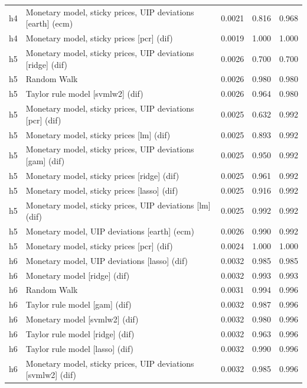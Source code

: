 \begin{ThreePartTable}
\begin{longtable}[t]{cp{5.5cm}ccc}
h4 & \raggedright Monetary model, sticky prices, UIP deviations [earth] (ecm) & 0.0021 & 0.816 & 0.968\\
h4 & \raggedright Monetary model, sticky prices [pcr] (dif) & 0.0019 & 1.000 & 1.000\\
\addlinespace
h5 & \raggedright Monetary model, sticky prices, UIP deviations [ridge] (dif) & 0.0026 & 0.700 & 0.700\\
h5 & \raggedright Random Walk & 0.0026 & 0.980 & 0.980\\
h5 & \raggedright Taylor rule model [svmlw2] (dif) & 0.0026 & 0.964 & 0.980\\
h5 & \raggedright Monetary model, sticky prices, UIP deviations [pcr] (dif) & 0.0025 & 0.632 & 0.992\\
h5 & \raggedright Monetary model, sticky prices [lm] (dif) & 0.0025 & 0.893 & 0.992\\
h5 & \raggedright Monetary model, sticky prices, UIP deviations [gam] (dif) & 0.0025 & 0.950 & 0.992\\
h5 & \raggedright Monetary model, sticky prices [ridge] (dif) & 0.0025 & 0.961 & 0.992\\
h5 & \raggedright Monetary model, sticky prices [lasso] (dif) & 0.0025 & 0.916 & 0.992\\
h5 & \raggedright Monetary model, sticky prices, UIP deviations [lm] (dif) & 0.0025 & 0.992 & 0.992\\
h5 & \raggedright Monetary model, UIP deviations [earth] (ecm) & 0.0026 & 0.990 & 0.992\\
h5 & \raggedright Monetary model, sticky prices [pcr] (dif) & 0.0024 & 1.000 & 1.000\\
\addlinespace
h6 & \raggedright Monetary model, UIP deviations [lasso] (dif) & 0.0032 & 0.985 & 0.985\\
h6 & \raggedright Monetary model [ridge] (dif) & 0.0032 & 0.993 & 0.993\\
h6 & \raggedright Random Walk & 0.0031 & 0.994 & 0.996\\
h6 & \raggedright Taylor rule model [gam] (dif) & 0.0032 & 0.987 & 0.996\\
h6 & \raggedright Monetary model [svmlw2] (dif) & 0.0032 & 0.980 & 0.996\\
h6 & \raggedright Taylor rule model [ridge] (dif) & 0.0032 & 0.963 & 0.996\\
h6 & \raggedright Taylor rule model [lasso] (dif) & 0.0032 & 0.990 & 0.996\\
h6 & \raggedright Monetary model, sticky prices, UIP deviations [svmlw2] (dif) & 0.0032 & 0.985 & 0.996\\

\end{longtable}
\end{ThreePartTable}
